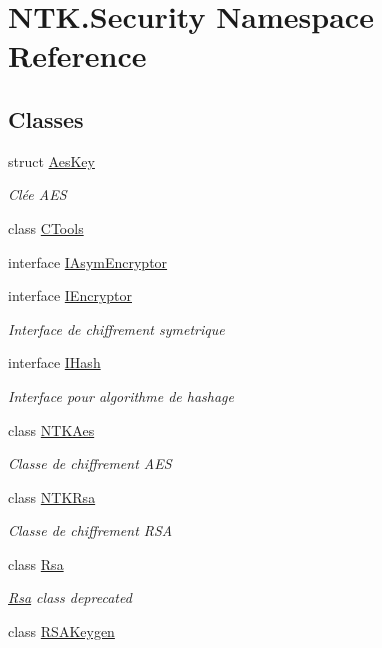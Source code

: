 \hypertarget{namespace_n_t_k_1_1_security}{}\section{N\+T\+K.\+Security Namespace Reference}
\label{namespace_n_t_k_1_1_security}
\subsection*{Classes}
\begin{DoxyCompactItemize}
\item 
struct \mbox{\hyperlink{struct_n_t_k_1_1_security_1_1_aes_key}{Aes\+Key}}
\begin{DoxyCompactList}\small\item\em Clée A\+ES \end{DoxyCompactList}\item 
class \mbox{\hyperlink{class_n_t_k_1_1_security_1_1_c_tools}{C\+Tools}}
\item 
interface \mbox{\hyperlink{interface_n_t_k_1_1_security_1_1_i_asym_encryptor}{I\+Asym\+Encryptor}}
\item 
interface \mbox{\hyperlink{interface_n_t_k_1_1_security_1_1_i_encryptor}{I\+Encryptor}}
\begin{DoxyCompactList}\small\item\em Interface de chiffrement symetrique \end{DoxyCompactList}\item 
interface \mbox{\hyperlink{interface_n_t_k_1_1_security_1_1_i_hash}{I\+Hash}}
\begin{DoxyCompactList}\small\item\em Interface pour algorithme de hashage \end{DoxyCompactList}\item 
class \mbox{\hyperlink{class_n_t_k_1_1_security_1_1_n_t_k_aes}{N\+T\+K\+Aes}}
\begin{DoxyCompactList}\small\item\em Classe de chiffrement A\+ES \end{DoxyCompactList}\item 
class \mbox{\hyperlink{class_n_t_k_1_1_security_1_1_n_t_k_rsa}{N\+T\+K\+Rsa}}
\begin{DoxyCompactList}\small\item\em Classe de chiffrement R\+SA \end{DoxyCompactList}\item 
class \mbox{\hyperlink{class_n_t_k_1_1_security_1_1_rsa}{Rsa}}
\begin{DoxyCompactList}\small\item\em \mbox{\hyperlink{class_n_t_k_1_1_security_1_1_rsa}{Rsa}} class deprecated \end{DoxyCompactList}\item 
class \mbox{\hyperlink{class_n_t_k_1_1_security_1_1_r_s_a_keygen}{R\+S\+A\+Keygen}}
\end{DoxyCompactItemize}
